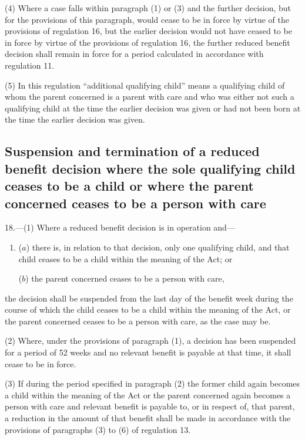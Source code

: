 \documentclass[12pt,a4paper]{article}
\begin{document}
(4) Where a case falls within paragraph (1) or (3) and the further decision, but for the provisions of this paragraph, would cease to be in force by virtue of the provisions of regulation 16, but the earlier decision would not have ceased to be in force by virtue of the provisions of regulation 16, the further reduced benefit decision shall remain in force for a period calculated in accordance with regulation 11.

(5) In this regulation “additional qualifying child” means a qualifying child of whom the parent concerned is a parent with care and who was either not such a qualifying child at the time the earlier decision was given or had not been born at the time the earlier decision was given.

\subsection[18. Suspension and termination of a reduced benefit decision where the sole qualifying child ceases to be a child or where the parent concerned ceases to be a person with care]{\sloppy Suspension and termination of a reduced benefit decision where the sole qualifying child ceases to be a child or where the parent concerned ceases to be a person with care}

18.---(1)  Where a reduced benefit decision is in operation and—
\begin{enumerate}\item[]
($a$) there is, in relation to that decision, only one qualifying child, and that child ceases to be a child within the meaning of the Act; or

($b$) the parent concerned ceases to be a person with care,
\end{enumerate}
the decision shall be suspended from the last day of the benefit week during the course of which the child ceases to be a child within the meaning of the Act, or the parent concerned ceases to be a person with care, as the case may be.

(2) Where, under the provisions of paragraph (1), a decision has been suspended for a period of 52 weeks and no relevant benefit is payable at that time, it shall cease to be in force.

(3) If during the period specified in paragraph (2) the former child again becomes a child within the meaning of the Act or the parent concerned again becomes a person with care and relevant benefit is payable to, or in respect of, that parent, a reduction in the amount of that benefit shall be made in accordance with the provisions of paragraphs (3) to (6) of regulation 13.
\end{document}
